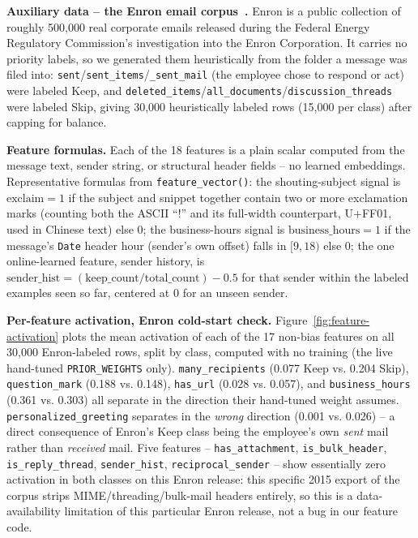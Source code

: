 \documentclass[twoside,twocolumn,10pt]{article}
\begin{document}
\textbf{Auxiliary data -- the Enron email corpus~\cite{klimt2004enron}.} Enron is a public collection of roughly 500{,}000 real corporate emails released during the Federal Energy Regulatory Commission's investigation into the Enron Corporation. It carries no priority labels, so we generated them heuristically from the folder a message was filed into: \texttt{sent}/\texttt{sent\_items}/\texttt{\_sent\_mail} (the employee chose to respond or act) were labeled Keep, and \texttt{deleted\_items}/\texttt{all\_documents}/\texttt{discussion\_threads} were labeled Skip, giving 30{,}000 heuristically labeled rows (15{,}000 per class) after capping for balance.

\textbf{Feature formulas.} Each of the 18 features is a plain scalar computed from the message text, sender string, or structural header fields -- no learned embeddings. Representative formulas from \texttt{feature\_vector()}: the shouting-subject signal is $\text{exclaim}=1$ if the subject and snippet together contain two or more exclamation marks (counting both the ASCII ``!'' and its full-width counterpart, U+FF01, used in Chinese text) else $0$; the business-hours signal is $\text{business\_hours}=1$ if the message's \texttt{Date} header hour (sender's own offset) falls in $[9,18)$ else $0$; the one online-learned feature, sender history, is $\text{sender\_hist} = (\text{keep\_count}/\text{total\_count}) - 0.5$ for that sender within the labeled examples seen so far, centered at $0$ for an unseen sender.

\textbf{Per-feature activation, Enron cold-start check.} Figure~\ref{fig:feature-activation} plots the mean activation of each of the 17 non-bias features on all 30{,}000 Enron-labeled rows, split by class, computed with no training (the live hand-tuned \texttt{PRIOR\_WEIGHTS} only). \texttt{many\_recipients} (0.077 Keep vs. 0.204 Skip), \texttt{question\_mark} (0.188 vs. 0.148), \texttt{has\_url} (0.028 vs. 0.057), and \texttt{business\_hours} (0.361 vs. 0.303) all separate in the direction their hand-tuned weight assumes. \texttt{personalized\_greeting} separates in the \emph{wrong} direction (0.001 vs. 0.026) -- a direct consequence of Enron's Keep class being the employee's own \emph{sent} mail rather than \emph{received} mail. Five features -- \texttt{has\_attachment}, \texttt{is\_bulk\_header}, \texttt{is\_reply\_thread}, \texttt{sender\_hist}, \texttt{reciprocal\_sender} -- show essentially zero activation in both classes on this Enron release: this specific 2015 export of the corpus strips MIME/threading/bulk-mail headers entirely, so this is a data-availability limitation of this particular Enron release, not a bug in our feature code.
\end{document}

